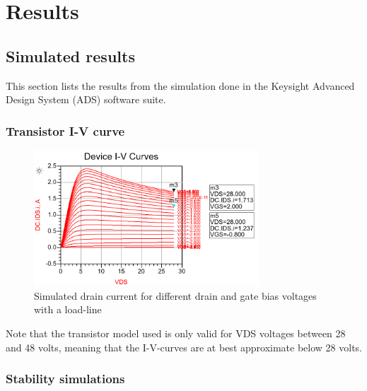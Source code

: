 \chapter{Results}

\section{Simulated results}
This section lists the results from the simulation done in the Keysight Advanced Design System (ADS) software suite.

\subsection{Transistor I-V curve}

  \begin{figure}[H]
	  \centering
	  \includegraphics[width=0.75\textwidth]{img/01_IVCurve}
	  \caption{Simulated drain current for different drain and gate bias voltages with a load-line}
	  \label{fig:fig_IV}
  \end{figure}

  Note that the transistor model used is only valid for VDS voltages between 28 and 48 volts, meaning that the I-V-curves are at best approximate below 28 volts.

  \subsection{Stability simulations}

